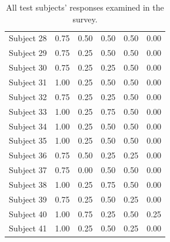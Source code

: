 \begin{appendices}
\begin{table}[!htp]
{\begin{tabular}{l||c|c|c|c|c}
Subject 28 & 0.75 & 0.50 & 0.50 & 0.50 & 0.00 \\
Subject 29 & 0.75 & 0.25 & 0.50 & 0.50 & 0.00 \\
Subject 30 & 0.75 & 0.25 & 0.25 & 0.50 & 0.00 \\
Subject 31 & 1.00 & 0.25 & 0.50 & 0.50 & 0.00 \\
Subject 32 & 0.75 & 0.25 & 0.25 & 0.50 & 0.00 \\
Subject 33 & 1.00 & 0.25 & 0.75 & 0.50 & 0.00 \\
Subject 34 & 1.00 & 0.25 & 0.50 & 0.50 & 0.00 \\
Subject 35 & 1.00 & 0.25 & 0.50 & 0.50 & 0.00 \\
Subject 36 & 0.75 & 0.50 & 0.25 & 0.25 & 0.00 \\
Subject 37 & 0.75 & 0.00 & 0.50 & 0.50 & 0.00 \\
Subject 38 & 1.00 & 0.25 & 0.75 & 0.50 & 0.00 \\
Subject 39 & 0.75 & 0.25 & 0.50 & 0.25 & 0.00 \\
Subject 40 & 1.00 & 0.75 & 0.25 & 0.50 & 0.25 \\
Subject 41 & 1.00 & 0.25 & 0.50 & 0.25 & 0.00 \\
\end{tabular}
}
\caption[Survey: Raw Data]{All test subjects' responses examined in the survey.}
\label{tab:survey_ttest}
\end{table}


\end{appendices}
